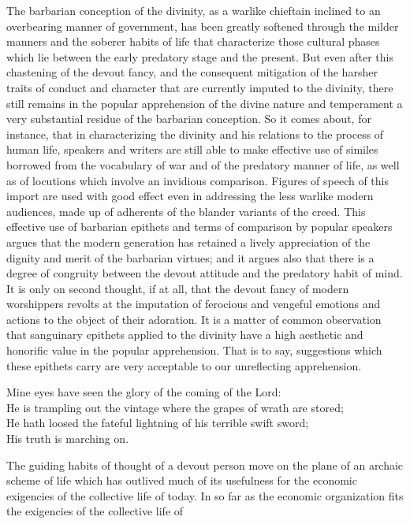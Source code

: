 \documentclass[12pt]{report}
\begin{document}
The barbarian conception of the divinity, as a warlike chieftain
inclined to an overbearing manner of government, has been greatly
softened through the milder manners and the soberer habits of life that
characterize those cultural phases which lie between the early predatory
stage and the present. But even after this chastening of the devout
fancy, and the consequent mitigation of the harsher traits of conduct
and character that are currently imputed to the divinity, there still
remains in the popular apprehension of the divine nature and temperament
a very substantial residue of the barbarian conception. So it comes
about, for instance, that in characterizing the divinity and his
relations to the process of human life, speakers and writers are still
able to make effective use of similes borrowed from the vocabulary of
war and of the predatory manner of life, as well as of locutions which
involve an invidious comparison. Figures of speech of this import
are used with good effect even in addressing the less warlike modern
audiences, made up of adherents of the blander variants of the creed.
This effective use of barbarian epithets and terms of comparison by
popular speakers argues that the modern generation has retained a lively
appreciation of the dignity and merit of the barbarian virtues; and
it argues also that there is a degree of congruity between the devout
attitude and the predatory habit of mind. It is only on second thought,
if at all, that the devout fancy of modern worshippers revolts at the
imputation of ferocious and vengeful emotions and actions to the object
of their adoration. It is a matter of common observation that sanguinary
epithets applied to the divinity have a high aesthetic and honorific
value in the popular apprehension. That is to say, suggestions
which these epithets carry are very acceptable to our unreflecting
apprehension.
\begin{displayquote}
  Mine eyes have seen the glory of the coming of the Lord: \\
  He is trampling out the vintage where the grapes of wrath are stored; \\
  He hath loosed the fateful lightning of his terrible swift sword; \\
  His truth is marching on.
\end{displayquote}
The guiding habits of thought of a devout person move on the plane of an
archaic scheme of life which has outlived much of its usefulness for the
economic exigencies of the collective life of today. In so far as the
economic organization fits the exigencies of the collective life of
\end{document}
